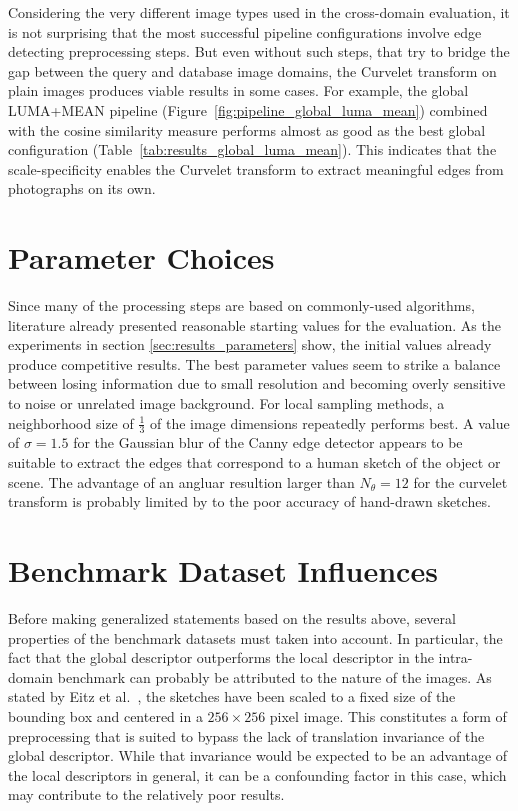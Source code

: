 Considering the very different image types used in the cross-domain evaluation,
it is not surprising that the most successful pipeline configurations involve
edge detecting preprocessing steps. But even without such steps, that try to
bridge the gap between the query and database image domains, the Curvelet
transform on plain images produces viable results in some cases. For example,
the global LUMA+MEAN pipeline (Figure~\ref{fig:pipeline_global_luma_mean})
combined with the cosine similarity measure performs almost as good as the best
global configuration (Table~\ref{tab:results_global_luma_mean}). This indicates
that the scale-specificity enables the Curvelet transform to extract meaningful
edges from photographs on its own.

\section{Parameter Choices}

Since many of the processing steps are based on commonly-used algorithms,
literature already presented reasonable starting values for the evaluation. As
the experiments in section \ref{sec:results_parameters} show, the initial
values already produce competitive results. The best parameter values seem to
strike a balance between losing information due to small resolution and
becoming overly sensitive to noise or unrelated image background. For local
sampling methods, a neighborhood size of $\frac{1}{3}$ of the image dimensions
repeatedly performs best. A value of $\sigma=1.5$ for the Gaussian blur of the
Canny edge detector appears to be suitable to extract the edges that correspond
to a human sketch of the object or scene. The advantage of an angluar resultion
larger than $N_{\theta}=12$ for the curvelet transform is probably limited by
to the poor accuracy of hand-drawn sketches.

\section{Benchmark Dataset Influences}

Before making generalized statements based on the results above, several
properties of the benchmark datasets must taken into account. In particular,
the fact that the global descriptor outperforms the local descriptor in the
intra-domain benchmark can probably be attributed to the nature of the images.
As stated by Eitz et al.\ \autocite{eitz_how_2012}, the sketches have been
scaled to a fixed size of the bounding box and centered in a $256 \times 256$
pixel image. This constitutes a form of preprocessing that is suited to bypass
the lack of translation invariance of the global descriptor. While that
invariance would be expected to be an advantage of the local descriptors in
general, it can be a confounding factor in this case, which may contribute to
the relatively poor results.

